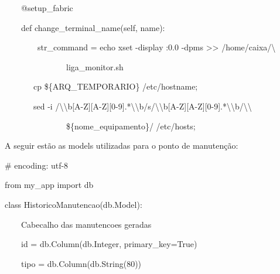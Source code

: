 {\ttfamily\color[rgb]{0.10980392,0.10980392,0.10980392}
    \ \ \ \ @setup\_fabric}

{\ttfamily\color[rgb]{0.10980392,0.10980392,0.10980392}
    \ \ \ \ def change\_terminal\_name(self, name):}

{\ttfamily\color[rgb]{0.10980392,0.10980392,0.10980392}
    \ \ \ \ \ \ \ \ str\_command = {\textquotedbl}{\textquotedbl}{\textquotedbl}echo {\textquotedbl}xset -display :0.0
        -dpms{\textquotedbl} {\textgreater}{\textgreater} /home/caixa/{\textbackslash}}

{\ttfamily\color[rgb]{0.10980392,0.10980392,0.10980392}
    \ \ \ \ \ \ \ \ \ \ \ \ \ \ \ liga\_monitor.sh}

{\ttfamily\color[rgb]{0.10980392,0.10980392,0.10980392}
    \ \ \ \ \ \ \ cp \$\{ARQ\_TEMPORARIO\} /etc/hostname;}

{\ttfamily\color[rgb]{0.10980392,0.10980392,0.10980392}
    \ \ \ \ \ \ \ sed -i
    {\textquotedbl}/{\textbackslash}{\textbackslash}b[A-Z][A-Z][0-9].*{\textbackslash}{\textbackslash}b/s/{\textbackslash}{\textbackslash}b[A-Z][A-Z][0-9].*{\textbackslash}{\textbackslash}b/{\textbackslash}{\textbackslash}}

{\ttfamily\color[rgb]{0.10980392,0.10980392,0.10980392}
    \ \ \ \ \ \ \ \ \ \ \ \ \ \ \ \$\{nome\_equipamento\}/{\textquotedbl}
    /etc/hosts;{\textquotedbl}{\textquotedbl}{\textquotedbl}}

{\color{black}
    A seguir est\~ao as models utilizadas para o ponto de manuten\c{c}\~ao:}

{\ttfamily\color[rgb]{0.10980392,0.10980392,0.10980392}
    \# encoding: utf-8}

{\ttfamily\color[rgb]{0.10980392,0.10980392,0.10980392}
    from my\_app import db}


    \bigskip


    \bigskip

{\ttfamily\color[rgb]{0.10980392,0.10980392,0.10980392}
    class HistoricoManutencao(db.Model):}

{\ttfamily\color[rgb]{0.10980392,0.10980392,0.10980392}
    \ \ \ \ {\textquotedbl}{\textquotedbl}{\textquotedbl}Cabecalho das manutencoes
        geradas{\textquotedbl}{\textquotedbl}{\textquotedbl}}

{\ttfamily\color[rgb]{0.10980392,0.10980392,0.10980392}
    \ \ \ \ id = db.Column(db.Integer, primary\_key=True)}

{\ttfamily\color[rgb]{0.10980392,0.10980392,0.10980392}
    \ \ \ \ tipo = db.Column(db.String(80))}

